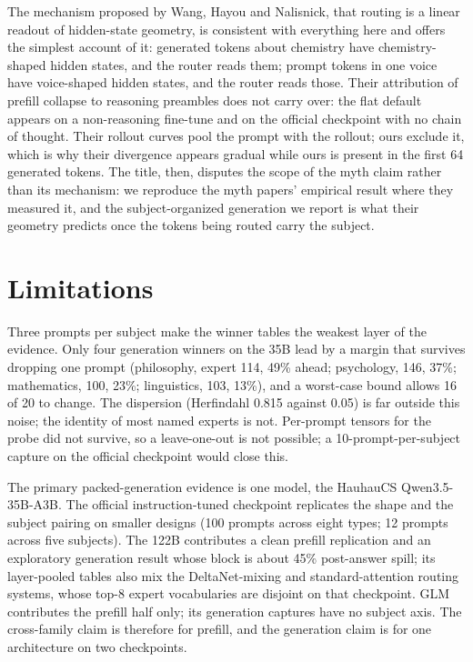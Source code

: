 \documentclass[10pt,twocolumn]{article}
\begin{document}
The mechanism proposed by Wang, Hayou and Nalisnick, that routing is a linear readout of hidden-state geometry, is consistent with everything here and offers the simplest account of it: generated tokens about chemistry have chemistry-shaped hidden states, and the router reads them; prompt tokens in one voice have voice-shaped hidden states, and the router reads those. Their attribution of prefill collapse to reasoning preambles does not carry over: the flat default appears on a non-reasoning fine-tune and on the official checkpoint with no chain of thought. Their rollout curves pool the prompt with the rollout; ours exclude it, which is why their divergence appears gradual while ours is present in the first 64 generated tokens. The title, then, disputes the scope of the myth claim rather than its mechanism: we reproduce the myth papers' empirical result where they measured it, and the subject-organized generation we report is what their geometry predicts once the tokens being routed carry the subject.

\section{Limitations}
\label{sec:limits}

Three prompts per subject make the winner tables the weakest layer of the evidence. Only four generation winners on the 35B lead by a margin that survives dropping one prompt (philosophy, expert 114, 49\% ahead; psychology, 146, 37\%; mathematics, 100, 23\%; linguistics, 103, 13\%), and a worst-case bound allows 16 of 20 to change. The dispersion (Herfindahl 0.815 against 0.05) is far outside this noise; the identity of most named experts is not. Per-prompt tensors for the probe did not survive, so a leave-one-out is not possible; a 10-prompt-per-subject capture on the official checkpoint would close this.

The primary packed-generation evidence is one model, the HauhauCS Qwen3.5-35B-A3B. The official instruction-tuned checkpoint replicates the shape and the subject pairing on smaller designs (100 prompts across eight types; 12 prompts across five subjects). The 122B contributes a clean prefill replication and an exploratory generation result whose block is about 45\% post-answer spill; its layer-pooled tables also mix the DeltaNet-mixing and standard-attention routing systems, whose top-8 expert vocabularies are disjoint on that checkpoint. GLM contributes the prefill half only; its generation captures have no subject axis. The cross-family claim is therefore for prefill, and the generation claim is for one architecture on two checkpoints.
\end{document}
